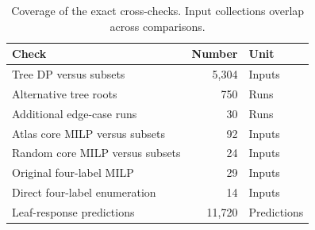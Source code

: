 \begin{table}[H]
\caption{Coverage of the exact cross-checks. Input collections overlap across comparisons.}\label{tab:checks}
\centering\begin{tabular}{lrl}
\hline Check & Number & Unit\\\hline
Tree DP versus subsets & 5,304 & Inputs\\
Alternative tree roots & 750 & Runs\\
Additional edge-case runs & 30 & Runs\\
Atlas core MILP versus subsets & 92 & Inputs\\
Random core MILP versus subsets & 24 & Inputs\\
Original four-label MILP & 29 & Inputs\\
Direct four-label enumeration & 14 & Inputs\\
Leaf-response predictions & 11,720 & Predictions\\
\hline\end{tabular}\end{table}
